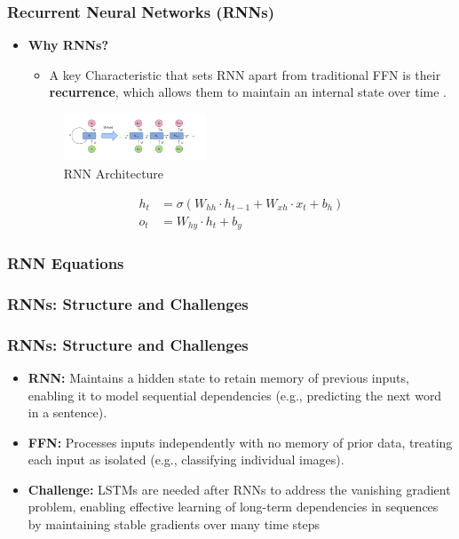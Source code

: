 \documentclass{beamer}
\begin{document}
\begin{frame}
    \frametitle{Recurrent Neural Networks (RNNs)}
    \begin{itemize}
        \item \textbf{Why RNNs?}
        \begin{itemize}
            \item A key Characteristic that sets RNN apart from traditional FFN is their \textbf{recurrence}, which allows them to maintain an internal state over time .
                \end{itemize}
            \begin{figure}[h]  %
                \centering
                \includegraphics[width=0.4\textwidth]{RNN.png}
                \caption{RNN Architecture} 
            \end{figure}     
            \begin{align}
            h_t &= \sigma(W_{hh} \cdot h_{t-1} + W_{xh} \cdot x_t + b_h) \\
            o_t &= W_{hy} \cdot h_t + b_y
        \end{align}
        \end{itemize}
        
    \frametitle{RNN Equations}
    
    \end{frame}
    
    
    
    
    \frametitle{RNNs: Structure and Challenges}
    \begin{frame}
    \frametitle{RNNs: Structure and Challenges}
    
    \begin{itemize}
        \item\textbf{RNN:} Maintains a hidden state to retain memory of previous inputs, enabling it to model sequential dependencies (e.g., predicting the next word in a sentence).
    
        \item\textbf{FFN:} Processes inputs independently with no memory of prior data, treating each input as isolated (e.g., classifying individual images).
    \item \textbf{Challenge:} LSTMs are needed after RNNs to address the vanishing gradient problem, enabling effective learning of long-term dependencies in sequences by maintaining stable gradients over many time steps  
        
        \end{itemize}
    
    
    
    \end{frame}
\end{document}
